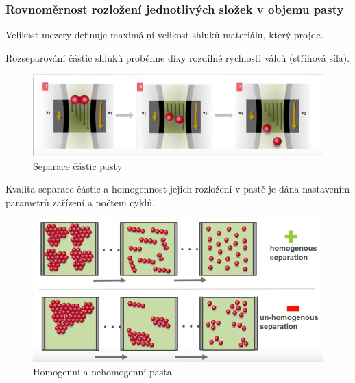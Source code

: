 \subsubsection{Rovnoměrnost rozložení jednotlivých složek v objemu pasty}
Velikost mezery definuje maximální velikost shluků materiálu, který projde.

Rozseparování částic shluků proběhne díky rozdílné rychlosti válců (střihová síla).

\begin{figure}[h]
   \begin{center}
     \includegraphics[scale=0.6]{images/separace.png}
   \end{center}
   \caption{Separace částic pasty}
\end{figure}
\newpage
Kvalita separace částic a homogennost jejich rozložení v pastě je dána
nastavením parametrů zařízení a počtem cyklů.

\begin{figure}[h]
   \begin{center}
     \includegraphics[scale=0.6]{images/hom.png}
   \end{center}
   \caption{Homogenní a nehomogenní pasta}
\end{figure}

























